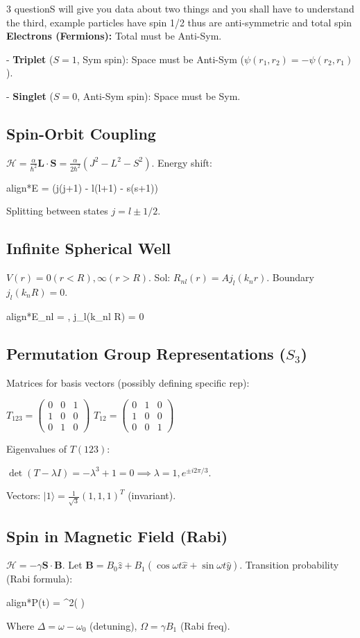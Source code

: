 \documentclass[10pt,a4paper]{article}
\newcommand{\important}[1]{\begin{empheq}[box=\fbox]{align*}#1\end{empheq}}
\begin{document}
\begin{multicols*}{3}
questionS will give you data about two things and you shall have to understand the third, example particles have spin 1/2 thus are anti-symmetric and total spin 
\textbf{Electrons (Fermions):} Total must be Anti-Sym.

- \textbf{Triplet} ($S=1$, Sym spin): Space must be Anti-Sym ($\psi(r_1, r_2) = -\psi(r_2, r_1)$).

- \textbf{Singlet} ($S=0$, Anti-Sym spin): Space must be Sym.

\subsection*{Spin-Orbit Coupling}
$\mathcal{H} = \frac{\alpha}{\hbar^2} \mathbf{L} \cdot \mathbf{S} = \frac{\alpha}{2\hbar^2}(J^2 - L^2 - S^2)$.
Energy shift:
\important{\Delta E =  (j(j+1) - l(l+1) - s(s+1))}
Splitting between states $j = l \pm 1/2$.



\subsection*{Infinite Spherical Well}
$V(r) = 0 (r<R), \infty (r>R)$.
Sol: $R_{nl}(r) = A j_l(k_n r)$. Boundary $j_l(k_n R) = 0$.
\important{E_{nl} = , \quad j_l(k_{nl} R) = 0}

\subsection*{Permutation Group Representations ($S_3$)}
Matrices for basis vectors (possibly defining specific rep):

$T_{123} = \begin{pmatrix} 0 & 0 & 1 \\ 1 & 0 & 0 \\ 0 & 1 & 0 \end{pmatrix}$
$T_{12} = \begin{pmatrix} 0 & 1 & 0 \\ 1 & 0 & 0 \\ 0 & 0 & 1 \end{pmatrix}$

Eigenvalues of $T(123)$: 

$\det(T - \lambda I) = -\lambda^3 + 1 = 0 \implies \lambda = 1, e^{\pm i 2\pi/3}$.

Vectors: $|1\rangle = \frac{1}{\sqrt{3}}(1,1,1)^T$ (invariant).

\subsection*{Spin in Magnetic Field (Rabi)}
$\mathcal{H} = -\gamma \mathbf{S} \cdot \mathbf{B}$. Let $\mathbf{B} = B_0 \hat{z} + B_1 (\cos\omega t \hat{x} + \sin\omega t \hat{y})$.
Transition probability (Rabi formula):
\important{P(t) =  \sin^2\left( \frac{\sqrt{\Omega^2+\Delta^2}t}{2} \right)}
Where $\Delta = \omega - \omega_0$ (detuning), $\Omega = \gamma B_1$ (Rabi freq).


\end{multicols*}
\end{document}
